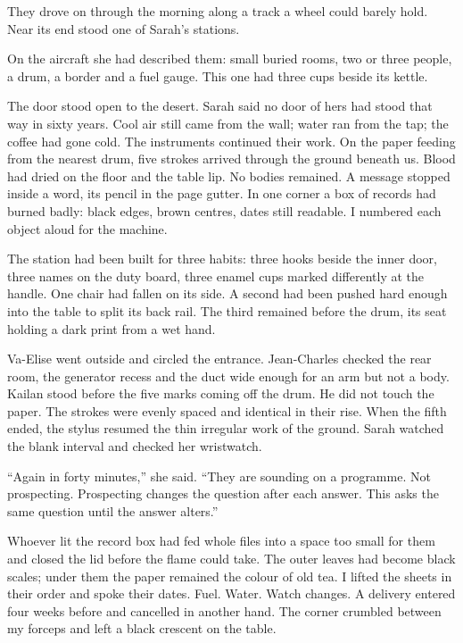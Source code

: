 \ornament

They drove on through the morning along a track a wheel could barely hold. Near its end stood one of Sarah's stations.\par

On the aircraft she had described them: small buried rooms, two or three people, a drum, a border and a fuel gauge. This one had three cups beside its kettle.\par

The door stood open to the desert. Sarah said no door of hers had stood that way in sixty years. Cool air still came from the wall; water ran from the tap; the coffee had gone cold. The instruments continued their work. On the paper feeding from the nearest drum, five strokes arrived through the ground beneath us. Blood had dried on the floor and the table lip. No bodies remained. A message stopped inside a word, its pencil in the page gutter. In one corner a box of records had burned badly: black edges, brown centres, dates still readable. I numbered each object aloud for the machine.\par

The station had been built for three habits: three hooks beside the inner door, three names on the duty board, three enamel cups marked differently at the handle. One chair had fallen on its side. A second had been pushed hard enough into the table to split its back rail. The third remained before the drum, its seat holding a dark print from a wet hand.\par

Va-Elise went outside and circled the entrance. Jean-Charles checked the rear room, the generator recess and the duct wide enough for an arm but not a body. Kailan stood before the five marks coming off the drum. He did not touch the paper. The strokes were evenly spaced and identical in their rise. When the fifth ended, the stylus resumed the thin irregular work of the ground. Sarah watched the blank interval and checked her wristwatch.\par

``Again in forty minutes,'' she said. ``They are sounding on a programme. Not prospecting. Prospecting changes the question after each answer. This asks the same question until the answer alters.''\par

Whoever lit the record box had fed whole files into a space too small for them and closed the lid before the flame could take. The outer leaves had become black scales; under them the paper remained the colour of old tea. I lifted the sheets in their order and spoke their dates. Fuel. Water. Watch changes. A delivery entered four weeks before and cancelled in another hand. The corner crumbled between my forceps and left a black crescent on the table.\par


